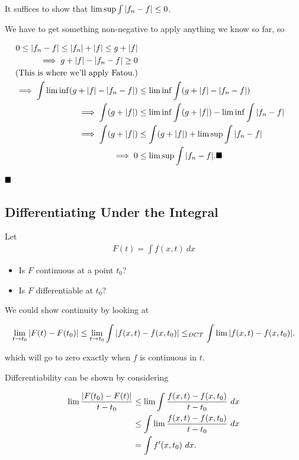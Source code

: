 It suffices to show that \(\limsup \int {\left\lvert {f_n - f} \right\rvert} \leq 0\).

We have to get something non-negative to apply anything we know so far,
so

\begin{align*}
0 \leq \abs{f_n - f} \leq \abs {f_n} + \abs f \leq g + \abs f \\
\implies g + \abs f - \abs{f_n - f} \geq 0 \\
(\text{This is where we'll apply Fatou.}) \\
\implies \int \liminf (g + \abs f - \abs{f_n -f}) &\leq \liminf \int (g + \abs f - \abs{f_n - f})\\
\implies \int (g + \abs f) &\leq \liminf \int(g + \abs f) - \liminf \int\abs{f_n - f} \\
\implies \int (g + \abs f) &\leq \int(g + \abs f) + \limsup \int\abs{f_n - f} \\
\implies 0 &\leq \limsup \int\abs{f_n - f}. \qed
\end{align*}

\(\qed\)

\hypertarget{differentiating-under-the-integral}{%
\subsection{Differentiating Under the
Integral}\label{differentiating-under-the-integral}}

Let
\begin{align*}
F(t) = \int f(x, t)~dx
\end{align*}

\begin{itemize}
\tightlist
\item
  Is \(F\) continuous at a point \(t_0\)?
\item
  Is \(F\) differentiable at \(t_0\)?
\end{itemize}

We could show continuity by looking at

\begin{align*}
\lim_{t \to t_0} {\left\lvert {F(t) - F(t_0)} \right\rvert} 
\leq \lim_{t\to t_0} \int {\left\lvert {f(x, t) - f(x, t_0)} \right\rvert} 
\leq_{DCT} \int \lim {\left\lvert {f(x, t) - f(x, t_0)} \right\rvert}
.\end{align*}

which will go to zero exactly when \(f\) is continuous in \(t\).

Differentiability can be shown by considering

\begin{align*}
\lim \frac{{\left\lvert {F(t_0) - F(t)} \right\rvert}}{t - t_0}
&\leq \lim \int \frac{f(x, t) - f(x, t_0)}{t - t_0} ~dx \\
&\leq \int \lim \frac{f(x, t) - f(x, t_0)}{t - t_0}~dx \\
&= \int f'(x, t_0)~dx
.\end{align*}

